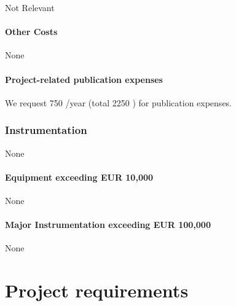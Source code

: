 \documentclass[10pt,fleqn,twoside]{article}
\begin{document}
Not Relevant

\paragraph{Other Costs}

None

\paragraph{Project-related publication expenses}

We request 750 \EUR{}/year (total 2250 \EUR{}) for publication expenses.

\subsubsection{Instrumentation}

None

\paragraph{Equipment exceeding EUR 10,000} 

None

\paragraph{Major Instrumentation exceeding EUR 100,000} 

None 

% 
% 
% 
% 
% 
% 
% 

\section{Project requirements}
\renewcommand{\leftmark}{\sc Project requirements}
\end{document}
